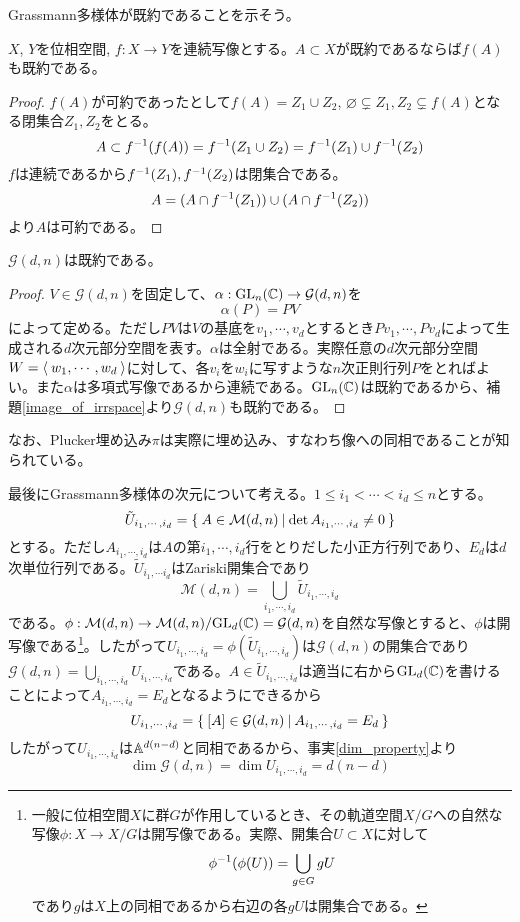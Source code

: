 \documentclass{ltjsreport}
\begin{document}
Grassmann多様体が既約であることを示そう。

\begin{lemm}\label{image_of_irrspace}
  $X$, $Y$を位相空間, $f:X\rightarrow Y$を連続写像とする。$A\subset X$が既約であるならば$f(A)$も既約である。
\end{lemm}

\begin{proof}
  $f(A)$が可約であったとして$f(A)=Z_1\cup Z_2$, $\varnothing\subsetneq Z_1,Z_2\subsetneq f(A)$となる閉集合$Z_1,Z_2$をとる。
  \[
  A\subset f^{-1}(f(A))=f^{-1}(Z_1\cup Z_2)=f^{-1}(Z_1)\cup f^{-1}(Z_2)  
  \]
  $f$は連続であるから$f^{-1}(Z_1), f^{-1}(Z_2)$は閉集合である。
  \[
  A=(A\cap f^{-1}(Z_1))\cup(A\cap f^{-1}(Z_2))
  \]
  より$A$は可約である。
\end{proof}

\begin{prop}
  $\mathcal{G}(d,n)$は既約である。
\end{prop}

\begin{proof}
  $V\in\mathcal{G}(d,n)$を固定して、$\alpha:\text{GL}_n(\mathbb{C})\rightarrow\mathcal{G}(d,n)$を
  \[
  \alpha(P)=PV  
  \]
  によって定める。ただし$PV$は$V$の基底を$v_1,\cdots,v_d$とするとき$Pv_1,\cdots,Pv_d$によって生成される$d$次元部分空間を表す。$\alpha$は全射である。実際任意の$d$次元部分空間$W=\langle\:w_1,\cdots,w_d\:\rangle$に対して、各$v_i$を$w_i$に写すような$n$次正則行列$P$をとればよい。また$\alpha$は多項式写像であるから連続である。$\text{GL}_n(\mathbb{C})$は既約であるから、補題\ref{image_of_irrspace}より$\mathcal{G}(d,n)$も既約である。
\end{proof}

なお、Plucker埋め込み$\pi$は実際に埋め込み、すなわち像への同相であることが知られている。

最後にGrassmann多様体の次元について考える。$1\leq i_1<\cdots <i_d\leq n$とする。
\[
\tilde{U}_{i_1,\cdots,i_d}=\left\{\:A\in\mathcal{M}(d,n)\:\middle|\:\det A_{i_1,\cdots,i_d}\neq 0\:\right\}  
\]
とする。ただし$A_{i_1,\cdots,i_d}$は$A$の第$i_1,\cdots,i_d$行をとりだした小正方行列であり、$E_d$は$d$次単位行列である。$\tilde{U}_{i_1,\cdots i_d}$はZariski開集合であり
\[
\mathcal{M}(d,n)=\bigcup_{i_1,\cdots,i_d}\tilde{U}_{i_1,\cdots,i_d}  
\]
である。$\phi:\mathcal{M}(d,n)\rightarrow \mathcal{M}(d,n)/\text{GL}_d(\mathbb{C})=\mathcal{G}(d,n)$を自然な写像とすると、$\phi$は開写像である\footnote{
  一般に位相空間$X$に群$G$が作用しているとき、その軌道空間$X/G$への自然な写像$\phi:X\rightarrow X/G$は開写像である。実際、開集合$U\subset X$に対して
  \[
  \phi^{-1}(\phi(U))=\bigcup_{g\in G}gU
  \]
  であり$g$は$X$上の同相であるから右辺の各$gU$は開集合である。
}。したがって$U_{i_1,\cdots,i_d}=\phi(\tilde{U}_{i_1,\cdots,i_d})$は$\mathcal{G}(d,n)$の開集合であり$\mathcal{G}(d,n)=\bigcup_{i_1,\cdots,i_d}U_{i_1,\cdots,i_d}$である。$A\in\tilde{U}_{i_1,\cdots,i_d}$は適当に右から$\text{GL}_d(\mathbb{C})$を書けることによって$A_{i_1,\cdots,i_d}=E_{d}$となるようにできるから
\[
U_{i_1,\cdots,i_d}=\left\{\:[A]\in\mathcal{G}(d,n)\:\middle|\:A_{i_1,\cdots,i_d}=E_d\:\right\}
\]
したがって$U_{i_1,\cdots,i_d}$は$\mathbb{A}^{d(n-d)}$と同相であるから、事実\ref{dim_property}より
\[
\dim\mathcal{G}(d,n)=\dim U_{i_1,\cdots,i_d}=d(n-d)  
\]
\end{document}
